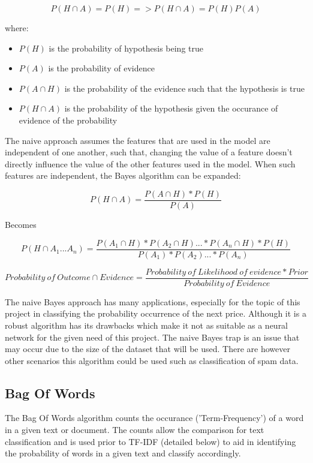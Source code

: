\documentclass[oneside, 12pt]{article}
\begin{document}
			\[P(H\cap A) = P(H) => P(H\cap A) = P(H)P(A)\]
			
			where:
			\begin{itemize}
				\item $P(H)$ is the probability of hypothesis being true
				\item $P(A)$ is the probability of evidence
				\item $P(A\cap H)$ is the probability of the evidence such that the hypothesis is true
				\item $P(H\cap A)$ is the probability of the hypothesis given the occurance of evidence of the probability
			\end{itemize}
		
			The naive approach assumes the features that are used in the model are independent of one another, such that, changing the value of a feature doesn't directly influence the value of the other features used in the model. When such features are independent, the Bayes algorithm can be expanded:
			
			\[P(H\cap A) = \frac{P(A\cap H) * P(H)}{P(A)} \]
			
			\begin{center}
				Becomes
			\end{center}
			
			\[P(H\cap A_1 ... A_n) = \frac{P(A_1\cap H) * P(A_2\cap H) ... * P(A_n\cap H) * P(H)}{P(A_1) * P(A_2) ... * P(A_n)} \]
			
			\[Probability \ of \ Outcome \cap Evidence = \frac{Probability \ of \ Likelihood \ of \ evidence * Prior}{Probability \ of \ Evidence} \]
			
			The naive Bayes approach has many applications, especially for the topic of this project in classifying the probability occurrence of the next price. Although it is a robust algorithm has its drawbacks which make it not as suitable as a neural network for the given need of this project. The naive Bayes trap is an issue that may occur due to the size of the dataset that will be used. There are however other scenarios this algorithm could be used such as classification of spam data.\cite{StudyNBC}
			
			\subsection{Bag Of Words}
			The Bag Of Words algorithm counts the occurance ('Term-Frequency') of a word in a given text or document. The counts allow the comparison for text classification and is used prior to TF-IDF (detailed below) to aid in identifying the probability of words in a given text and classify accordingly. \cite{TFIDFBOW}
			
\end{document}
